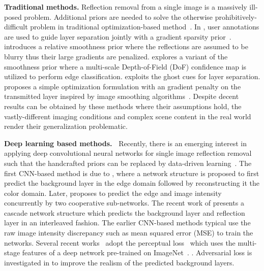 \documentclass[10pt,twocolumn,letterpaper]{article}
\begin{document}
\vspace{5pt}
\noindent\textbf{Traditional methods.}
Reflection removal from a single image is a massively ill-posed problem. Additional priors are needed to solve the otherwise prohibitively-difficult problem in traditional optimization-based method~\cite{levin2007user,Li2014Single,wan2016depth,Arvanitopoulos_2017_CVPR,Wan2018Region}. In \cite{levin2007user}, user annotations are used to guide layer separation jointly with a gradient sparsity prior~\cite{levin2003learning}. \cite{Li2014Single} introduces a relative smoothness prior where the reflections are assumed to be blurry thus their large gradients are penalized. \cite{wan2016depth} explores a variant of the smoothness prior where a multi-scale Depth-of-Field (DoF) confidence map is utilized to perform edge classification. \cite{Shih_2015_CVPR} exploits the ghost cues for layer separation. \cite{Arvanitopoulos_2017_CVPR} proposes a simple optimization formulation with an  gradient penalty on the transmitted layer inspired by image smoothing algorithms~\cite{L0smooth}.
Despite decent results can be obtained by these methods where their assumptions hold, the vastly-different imaging conditions and complex scene content in the real world render their generalization problematic. 


\vspace{5pt}
\noindent\textbf{Deep learning based methods.~}
Recently, there is an emerging interest in applying deep convolutional neural networks for single image reflection removal such that the handcrafted priors can be replaced by data-driven learning~\cite{fan2017generic,Wan_2018_CVPR,zhang2018single,eccv18refrmv}. The first CNN-based method is due to \cite{fan2017generic}, where a network structure is proposed to first predict the background layer in the edge domain followed by reconstructing it the color domain. Later, \cite{Wan_2018_CVPR} proposes to predict the edge and image intensity concurrently by two cooperative sub-networks. The recent work of \cite{eccv18refrmv} presents a cascade network structure which predicts the background layer and reflection layer in an interleaved fashion. The earlier CNN-based methods typical use the raw image intensity discrepancy such as mean squared error (MSE) to train the networks. Several recent works~\cite{zhang2018single,jin2018learning,chi2018single} adopt the perceptual loss~\cite{johnson2016perceptual} which uses the multi-stage features of a deep network pre-trained on ImageNet~\cite{russakovsky2015imagenet}.
\cite{zhang2018single}. Adversarial loss is investigated in \cite{zhang2018single,lee2018generative} to improve the realism of the predicted background layers.
\end{document}
